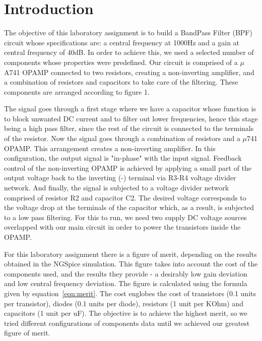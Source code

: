 \section{Introduction}
\label{sec:introduction}
The objective of this laboratory assignment is to build a BandPass Filter (BPF) circuit whose specifications are: a central frequency at 1000Hz and a gain at central frequency of 40dB.
In order to achieve this, we used a selected number of components whose properties were predefined.
Our circuit is comprised of a $\mu$A741 OPAMP connected to two resistors, creating a non-inverting amplifier, and a combination of resistors and capacitors to take care of the filtering. These components are arranged according to figure 1.

The signal goes through a first stage where we have a capacitor whose function is to block unwanted DC current and to filter out lower frequencies, hence this stage being a high pass filter, since the rest of the circuit is connected to the terminals of the resistor. Now the signal goes through a combination of resistors and a $\mu$741 OPAMP. This arrangement creates a non-inverting amplifier. In this configuration, the output signal is "in-phase" with the input signal. Feedback control of the non-inverting OPAMP is achieved by applying a small part of the output voltage back to the inverting (-) terminal via R3-R4 voltage divider network. And finally, the signal is subjected to a voltage divider network comprised of resistor R2 and capacitor C2. The desired voltage corresponds to the voltage drop at the terminals of the capacitor which, as a result, is subjected to a low pass filtering. For this to run, we need two supply DC voltage sources overlapped with our main circuit in order to power the transistors inside the OPAMP.

For this laboratory assignment there is a figure of merit, depending on the results obtained in the NGSpice simulation. This figure takes into account the cost of the components used, and the results they provide - a desirably low gain deviation and low central frequency deviation. The figure is calculated using the formula given by equation~\ref{eqn:merit}. The cost englobes the cost of transistors (0.1 units per transistor), diodes (0.1 units per diode), resistors (1 unit per KOhm) and capacitors (1 unit per uF). The objective is to achieve the highest merit, so we tried different configurations of components data until we achieved our greatest figure of merit.

